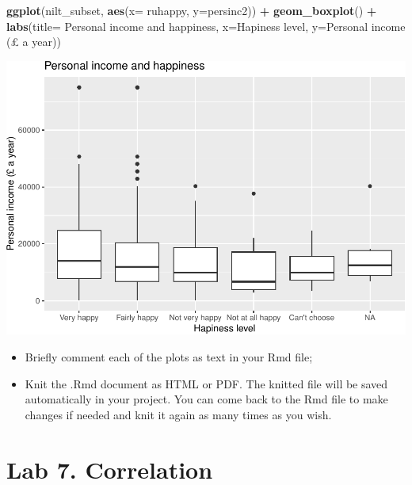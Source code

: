 \documentclass[
]{book}
\newenvironment{Shaded}{\begin{snugshade}}{\end{snugshade}}
\newcommand{\AttributeTok}[1]{\textcolor[rgb]{0.13,0.29,0.53}{#1}}
\newcommand{\FunctionTok}[1]{\textcolor[rgb]{0.13,0.29,0.53}{\textbf{#1}}}
\newcommand{\NormalTok}[1]{#1}
\newcommand{\SpecialCharTok}[1]{\textcolor[rgb]{0.81,0.36,0.00}{\textbf{#1}}}
\newcommand{\StringTok}[1]{\textcolor[rgb]{0.31,0.60,0.02}{#1}}
\providecommand{\tightlist}{%
  \setlength{\itemsep}{0pt}\setlength{\parskip}{0pt}}
\begin{document}
\begin{Shaded}
\begin{Highlighting}[]
\FunctionTok{ggplot}\NormalTok{(nilt\_subset, }\FunctionTok{aes}\NormalTok{(}\AttributeTok{x=}\NormalTok{ ruhappy, }\AttributeTok{y=}\NormalTok{persinc2)) }\SpecialCharTok{+}
  \FunctionTok{geom\_boxplot}\NormalTok{() }\SpecialCharTok{+}
  \FunctionTok{labs}\NormalTok{(}\AttributeTok{title=} \StringTok{\textquotesingle{}Personal income and happiness\textquotesingle{}}\NormalTok{, }
       \AttributeTok{x=}\StringTok{\textquotesingle{}Hapiness level\textquotesingle{}}\NormalTok{, }\AttributeTok{y=}\StringTok{\textquotesingle{}Personal income (£ a year)\textquotesingle{}}\NormalTok{)}
\end{Highlighting}
\end{Shaded}

\begin{flushleft}\includegraphics[width=1\linewidth]{lab-workbook_files/figure-latex/unnamed-chunk-131-1} \end{flushleft}

\begin{itemize}
\tightlist
\item
  Briefly comment each of the plots as text in your Rmd file;
\item
  Knit the .Rmd document as HTML or PDF. The knitted file will be saved automatically in your project. You can come back to the Rmd file to make changes if needed and knit it again as many times as you wish.
\end{itemize}

\hypertarget{lab-7.-correlation}{%
\section{Lab 7. Correlation}\label{lab-7.-correlation}}
\end{document}
